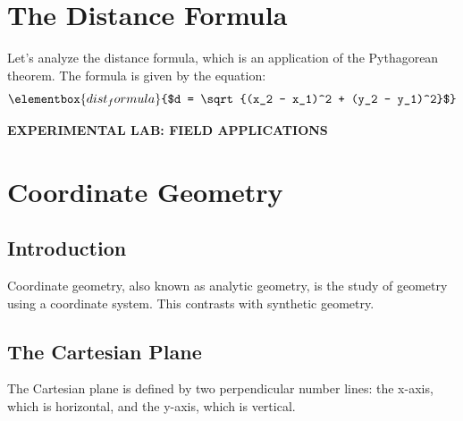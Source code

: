 \chapter{The Distance Formula}
Let's analyze the distance formula, which is an application of the Pythagorean theorem.
The formula is given by the equation:
\begin{equation}
    \elementbox{dist_formula}{$d = \sqrt{(x_2 - x_1)^2 + (y_2 - y_1)^2}$}
\end{equation}

\colorbox{practicegreen}{\parbox{\dimexpr\linewidth-2\fboxsep}{\centering\small\bfseries\color{white} EXPERIMENTAL LAB: FIELD APPLICATIONS}}
\vspace{15pt}



\chapter{Coordinate Geometry}
\section{Introduction}
Coordinate geometry, also known as analytic geometry, is the study of geometry using a coordinate system. This contrasts with synthetic geometry.

\section{The Cartesian Plane}
The Cartesian plane is defined by two perpendicular number lines: the x-axis, which is horizontal, and the y-axis, which is vertical.


